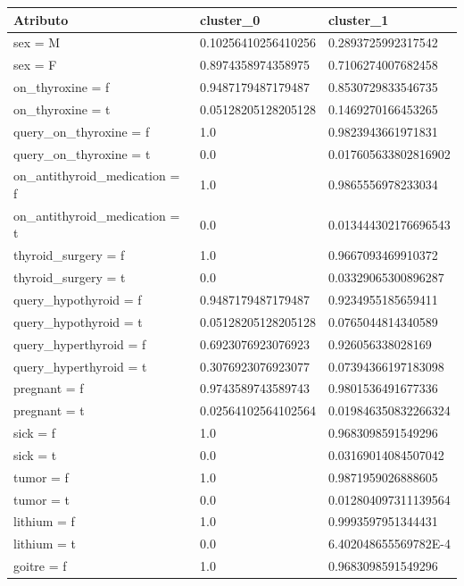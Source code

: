 \documentclass[osajnl,twocolumn,showpacs,superscriptaddress,10pt,floatfix]{revtex4-1} %
\begin{document}
\begin{table}[ht]
    \begin{tabular}{|l|l|l|}
        \hline
        Atributo & cluster\_0 & cluster\_1 \\
        \hline

        sex = M & 0.10256410256410256 & 0.2893725992317542 \\
        sex = F & 0.8974358974358975 & 0.7106274007682458 \\
        on\_thyroxine = f & 0.9487179487179487 & 0.8530729833546735 \\
        on\_thyroxine = t & 0.05128205128205128 & 0.1469270166453265 \\
        query\_on\_thyroxine = f & 1.0 & 0.9823943661971831 \\
        query\_on\_thyroxine = t & 0.0 & 0.017605633802816902 \\
        on\_antithyroid\_medication = f & 1.0 & 0.9865556978233034 \\
        on\_antithyroid\_medication = t & 0.0 & 0.013444302176696543 \\
        thyroid\_surgery = f & 1.0 & 0.9667093469910372 \\
        thyroid\_surgery = t & 0.0 & 0.03329065300896287 \\
        query\_hypothyroid = f & 0.9487179487179487 & 0.9234955185659411 \\
        query\_hypothyroid = t & 0.05128205128205128 & 0.0765044814340589 \\
        query\_hyperthyroid = f & 0.6923076923076923 & 0.926056338028169 \\
        query\_hyperthyroid = t & 0.3076923076923077 & 0.07394366197183098 \\
        pregnant = f & 0.9743589743589743 & 0.9801536491677336 \\
        pregnant = t & 0.02564102564102564 & 0.019846350832266324 \\
        sick = f & 1.0 & 0.9683098591549296 \\
        sick = t & 0.0 & 0.03169014084507042 \\
        tumor = f & 1.0 & 0.9871959026888605 \\
        tumor = t & 0.0 & 0.012804097311139564 \\
        lithium = f & 1.0 & 0.9993597951344431 \\
        lithium = t & 0.0 & 6.402048655569782E-4 \\
        goitre = f & 1.0 & 0.9683098591549296 \\

\end{tabular}
\end{table}
\end{document}
